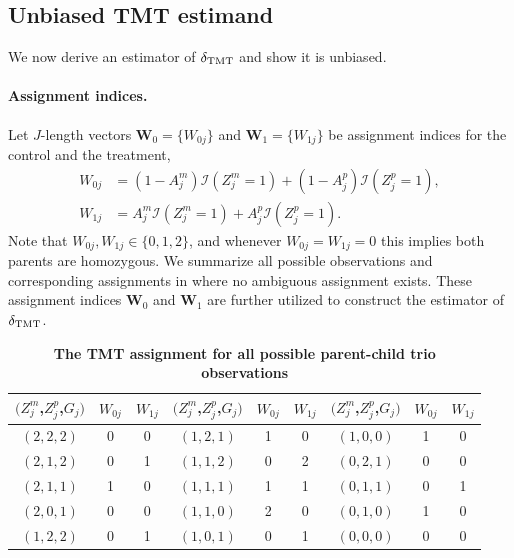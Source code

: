 \documentclass[12pt]{extarticle}
\newcommand{\nind}{J}
\newcommand{\indicator}{\mathcal{I}}
\newcommand{\tmt}{{\normalfont \text{TMT}}}
\newcommand\tablefontsize{\fontsize{12pt}{14pt}\selectfont}
\begin{document}
\subsection{Unbiased TMT estimand} \label{sec:dtmt}

We now derive an estimator of $\delta_{\tmt}$ and show it is unbiased.

\paragraph{Assignment indices.} Let $\nind$-length vectors $\boldsymbol{W}_0=\{W_{0j}\}$ and $\boldsymbol{W}_1=\{W_{1j}\}$ be assignment indices for the control and the treatment, 
\begin{align*}
W_{0j} &= (1-A_j^m) \indicator (Z_{j}^m=1) + (1-A_j^p) \indicator (Z_{j}^p=1), \nonumber \\
W_{1j} &= A_j^m \indicator (Z_{j}^m=1) + A_j^p \indicator (Z_{j}^p=1). 
\end{align*} Note that $W_{0j}, W_{1j} \in \{0, 1, 2\}$, and whenever $W_{0j} = W_{1j} = 0$ this implies both parents are homozygous. We summarize all possible observations and corresponding assignments in  where no ambiguous assignment exists. These assignment indices $\boldsymbol{W}_0$ and $\boldsymbol{W}_1$ are further utilized to construct the estimator of $\delta_{\tmt}$.

\begin{table}[ht]
\tablefontsize
\begin{center}
\caption{\textbf{The TMT assignment for all possible parent-child trio observations}}
\label{table:tmt_assignment}
\begin{tabular}{c c c c c c c c c}
\hline
$(Z_{j}^m$,$Z_{j}^p$,$G_{j})$ & $W_{0j}$ & $W_{1j}$ & $(Z_{j}^m$,$Z_{j}^p$,$G_{j})$ & $W_{0j}$ & $W_{1j}$ & $(Z_{j}^m$,$Z_{j}^p$,$G_{j})$ & $W_{0j}$ & $W_{1j}$ \\ \hline
$(2,2,2)$ & 0 & 0 & $(1,2,1)$ & 1 & 0 & $(1,0,0)$  & 1 & 0 \\ 
$(2,1,2)$  & 0 & 1 & $(1,1,2)$ & 0 & 2 & $(0,2,1)$ & 0 & 0 \\ 
$(2,1,1)$  & 1 & 0 & $(1,1,1)$ & 1 & 1 & $(0,1,1)$  & 0 & 1 \\ 
$(2,0,1)$ & 0 & 0 & $(1,1,0)$ & 2 & 0 & $(0,1,0)$  & 1 & 0 \\
$(1,2,2)$  & 0 & 1 & $(1,0,1)$ & 0 & 1 & $(0,0,0)$ & 0 & 0 \\ \hline
\end{tabular}
\end{center}
\end{table}
\end{document}
